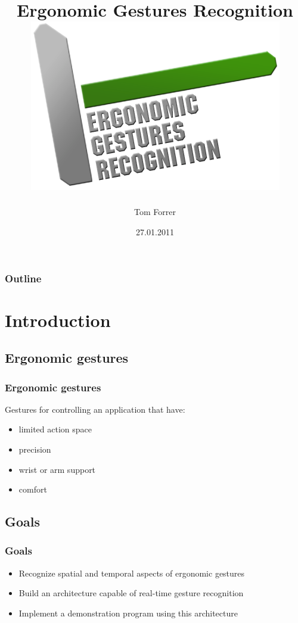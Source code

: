 \documentclass{beamer}
\title{Ergonomic Gestures Recognition\\ \includegraphics[scale=0.2]{images/egr}}
\author{Tom Forrer}
\date[2011]{27.01.2011}
\institute{DIVA}
\begin{document}
	\hskip-1cm\maketitle

	\begin{frame}
		\frametitle{Outline}
		\vspace*{-0.4cm}
		\tableofcontents
	\end{frame}
	
	\section{Introduction}
	
	\subsection{Ergonomic gestures}
	\begin{frame}
		\frametitle{Ergonomic gestures}
		Gestures for controlling an application that have:
		\begin{itemize}
			\item limited action space
			\item precision
			\item wrist or arm support
			\item comfort
		\end{itemize}
	\end{frame}
	\subsection{Goals}
	\begin{frame}
		\frametitle{Goals}
		\begin{itemize}
			\item Recognize spatial and temporal aspects of ergonomic gestures
			\item Build an architecture capable of real-time gesture recognition
			\item Implement a demonstration program using this architecture
		\end{itemize}
	\end{frame}
\end{document}
